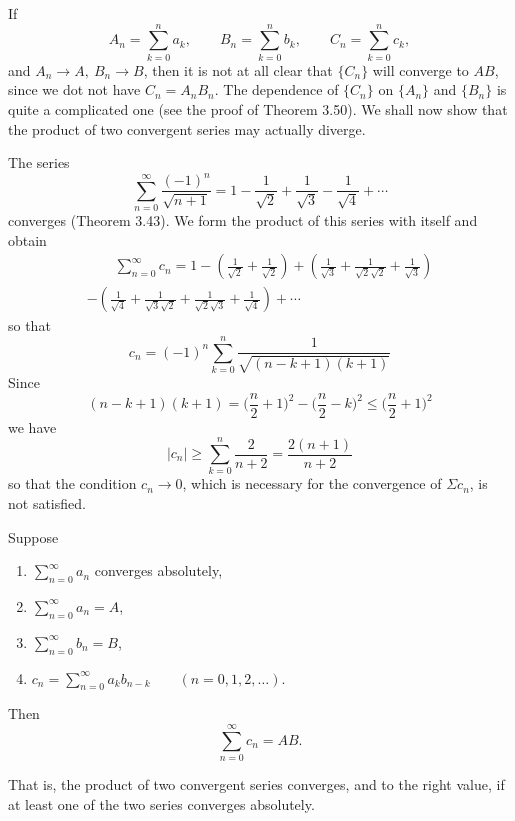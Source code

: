 \documentclass[../poma-notes.tex]{subfiles}
\begin{document}
\begin{example}
  If
  \[
    A_n = \sum_{k=0}^{n} a_k, \qquad B_n = \sum_{k=0}^{n} b_k, \qquad C_n = \sum_{k=0}^{n} c_k,
  \]
  and $A_n \to A,\ B_n \to B$, then it is not at all clear that $\{C_n\}$ will converge to $AB$, since we dot not
  have $C_n = A_n B_n$. The dependence of $\{C_n\}$ on $\{A_n\}$ and $\{B_n\}$ is quite a complicated one (see
  the proof of Theorem 3.50). We shall now show that the product of two convergent series may actually diverge.

  The series
  \[
    \sum_{n=0}^{\infty}\frac{(-1)^n}{\sqrt{n+1}} = 1-\frac{1}{\sqrt{2}}+\frac{1}{\sqrt{3}}-\frac{1}{\sqrt{4}}+\cdots
  \]
  converges (Theorem 3.43). We form the product of this series with itself and obtain
  \begin{multline*}
    \qquad \sum_{n=0}^{\infty} c_n = 1-(\frac{1}{\sqrt{2}}+\frac{1}{\sqrt{2}})+
    (\frac{1}{\sqrt{3}}+\frac{1}{\sqrt{2}\sqrt{2}}+\frac{1}{\sqrt{3}}) \\
    -(\frac{1}{\sqrt{4}}+\frac{1}{\sqrt{3}\sqrt{2}}+\frac{1}{\sqrt{2}\sqrt{3}}+\frac{1}{\sqrt{4}})+\cdots
    \qquad
  \end{multline*}
  so that
  \[
    c_n = (-1)^n \sum_{k=0}^{n} \frac{1}{\sqrt{(n-k+1)(k+1)}}
  \]
  Since
  \[
    (n-k+1)(k+1) = \biggl(\frac{n}{2}+1\biggr)^2 - \Biggl(\frac{n}{2}-k\Biggr)^2 \le \Biggl(\frac{n}{2}+1\Biggr)^2
  \]
  we have
  \[
    |c_n| \ge \sum_{k=0}^{n} \frac{2}{n+2} = \frac{2(n+1)}{n+2}
  \]
  so that the condition $c_n \to 0$, which is necessary for the convergence of $\Sigma c_n$, is not satisfied.
\end{example}

\begin{theorem}
  Suppose
  \begin{enumerate}[label=(\alph*)]
    \item $\sum_{n=0}^{\infty} a_n$ converges absolutely,
    \item $\sum_{n=0}^{\infty} a_n = A$,
    \item $\sum_{n=0}^{\infty} b_n = B$,
    \item $c_n = \sum_{n=0}^{\infty} a_k b_{n-k} \qquad (n=0,1,2,\dots)$.
  \end{enumerate}
  Then
  \[
    \sum_{n=0}^{\infty} c_n = AB.
  \]

  That is, the product of two convergent series converges, and to the right value, if at least one of the two series converges absolutely.
\end{theorem}
\end{document}
